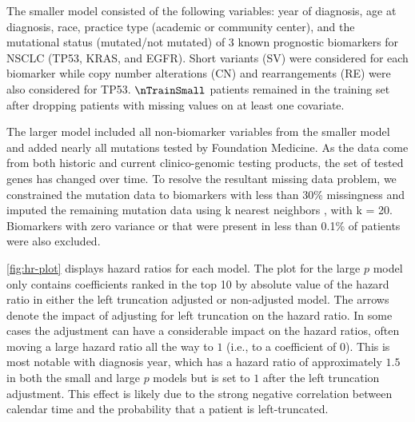 \documentclass[11pt,final,fleqn]{article}\usepackage[]{graphicx}\usepackage[]{color}
\theoremstyle{plain}
\begin{document}
The smaller model consisted of the following variables: year of diagnosis, age at diagnosis, race, practice type (academic or community center), and the mutational status (mutated/not mutated) of 3 known prognostic biomarkers for NSCLC (TP53, KRAS, and EGFR). Short variants (SV) were considered for each biomarker while copy number alterations (CN) and rearrangements (RE) were also considered for TP53. $\nTrainSmall$ patients remained in the training set after dropping patients with missing values on at least one covariate. 

The larger model included all non-biomarker variables from the smaller model and added nearly all mutations tested by Foundation Medicine. As the data come from both historic and current clinico-genomic testing products, the set of tested genes has changed over time. To resolve the resultant missing data problem, we constrained the mutation data to biomarkers with less than 30\% missingness and imputed the remaining mutation data using k nearest neighbors \cite{troyanskaya_missing_2001}, with k = 20. Biomarkers with zero variance or that were present in less than 0.1\% of patients were also excluded.

\autoref{fig:hr-plot} displays hazard ratios for each model. The plot for the large $p$ model only contains coefficients ranked in the top 10 by absolute value of the hazard ratio in either the left truncation adjusted or non-adjusted model.  The arrows denote the impact of adjusting for left truncation on the hazard ratio. In some cases the adjustment can have a considerable impact on the hazard ratios, often moving a large hazard ratio all the way to $1$ (i.e., to a coefficient of $0$). This is most notable with diagnosis year, which has a hazard ratio of approximately $1.5$ in both the small and large $p$ models but is set to $1$ after the left truncation adjustment. This effect is likely due to the strong negative correlation between calendar time and the probability that a patient is left-truncated. 
\end{document}
